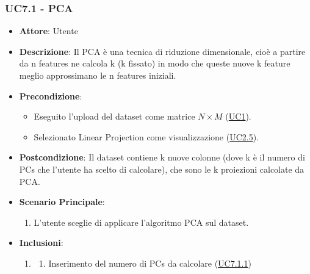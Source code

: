     \subsubsection{UC7.1 - PCA}
    \label{uc7.1}
    \begin{itemize}
    \item \textbf{Attore}: Utente
    \item \textbf{Descrizione}: Il PCA è una tecnica di riduzione dimensionale, cioè a partire da n features ne calcola k (k fissato) in modo che queste nuove k feature meglio approssimano le n features iniziali.
    \item \textbf{Precondizione}: 
    \begin{itemize}
        \item Eseguito l'upload del dataset come matrice $N\times M$ (\hyperref[uc1]{UC1}).
        \item Selezionato Linear Projection come visualizzazione (\hyperref[uc2.5]{UC2.5}).
    \end{itemize}  
    \item \textbf{Postcondizione}: Il dataset contiene k nuove colonne (dove k è il numero di PCs che l'utente ha scelto di calcolare), che sono le k proiezioni calcolate da PCA. 
    \item \textbf{Scenario Principale}: 
    \begin{enumerate}
        \item L'utente sceglie di applicare l'algoritmo PCA sul dataset.
    \end{enumerate}  
    \item \textbf{Inclusioni}:
        \begin{enumerate}
                \item \begin{enumerate}
                    \item Inserimento del numero di PCs da calcolare (\hyperref[uc7.1.1]{UC7.1.1})
                \end{enumerate}
        \end{enumerate} 
    \end{itemize}
    
